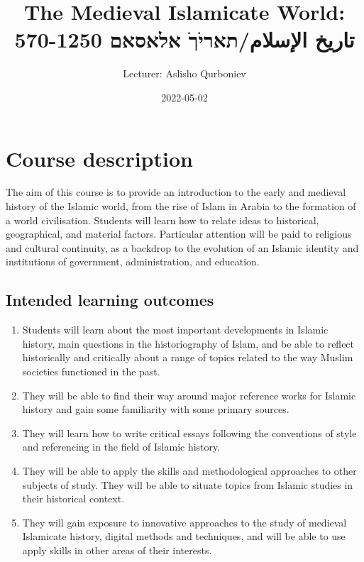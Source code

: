 \documentclass[
]{book}
\title{The Medieval Islamicate World: 570-1250 تاريخ الإسلام/תאריֹךֹ אלאסאם}
\author{Lecturer: Aslisho Qurboniev}
\date{2022-05-02}
\providecommand{\tightlist}{%
  \setlength{\itemsep}{0pt}\setlength{\parskip}{0pt}}
\begin{document}
\maketitle

{
\setcounter{tocdepth}{1}
\tableofcontents
}
\hypertarget{course-description}{%
\chapter{Course description}\label{course-description}}

The aim of this course is to provide an introduction to the early and medieval history of the Islamic world, from the rise of Islam in Arabia to the formation of a world civilisation. Students will learn how to relate ideas to historical, geographical, and material factors. Particular attention will be paid to religious and cultural continuity, as a backdrop to the evolution of an Islamic identity and institutions of government, administration, and education.

\hypertarget{intended-learning-outcomes}{%
\section{Intended learning outcomes}\label{intended-learning-outcomes}}

\begin{enumerate}
\def\labelenumi{\arabic{enumi}.}
\tightlist
\item
  Students will learn about the most important developments in Islamic history, main questions in the historiography of Islam, and be able to reflect historically and critically about a range of topics related to the way Muslim societies functioned in the past.
\item
  They will be able to find their way around major reference works for Islamic history and gain some familiarity with some primary sources.
\item
  They will learn how to write critical essays following the conventions of style and referencing in the field of Islamic history.
\item
  They will be able to apply the skills and methodological approaches to other subjects of study. They will be able to situate topics from Islamic studies in their historical context.
\item
  They will gain exposure to innovative approaches to the study of medieval Islamicate history, digital methods and techniques, and will be able to use apply skills in other areas of their interests.
\end{enumerate}
\end{document}
